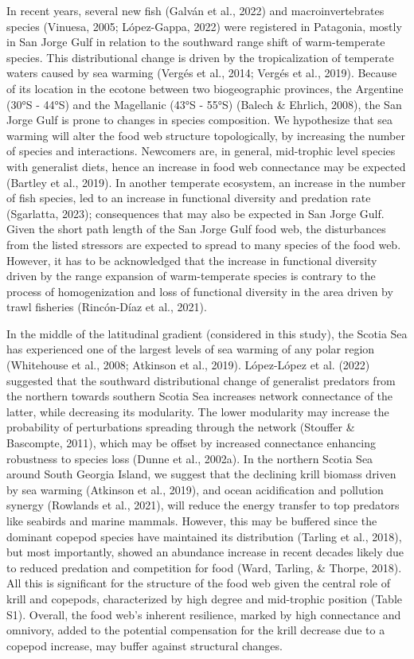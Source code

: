 \documentclass[
]{article}
\begin{document}
In recent years, several new fish (Galván et al., 2022) and
macroinvertebrates species (Vinuesa, 2005; López-Gappa, 2022) were
registered in Patagonia, mostly in San Jorge Gulf in relation to the
southward range shift of warm-temperate species. This distributional
change is driven by the tropicalization of temperate waters caused by
sea warming (Vergés et al., 2014; Vergés et al., 2019). Because of its
location in the ecotone between two biogeographic provinces, the
Argentine (30°S - 44°S) and the Magellanic (43°S - 55°S) (Balech \&
Ehrlich, 2008), the San Jorge Gulf is prone to changes in species
composition. We hypothesize that sea warming will alter the food web
structure topologically, by increasing the number of species and
interactions. Newcomers are, in general, mid-trophic level species with
generalist diets, hence an increase in food web connectance may be
expected (Bartley et al., 2019). In another temperate ecosystem, an
increase in the number of fish species, led to an increase in functional
diversity and predation rate (Sgarlatta, 2023); consequences that may
also be expected in San Jorge Gulf. Given the short path length of the
San Jorge Gulf food web, the disturbances from the listed stressors are
expected to spread to many species of the food web. However, it has to
be acknowledged that the increase in functional diversity driven by the
range expansion of warm-temperate species is contrary to the process of
homogenization and loss of functional diversity in the area driven by
trawl fisheries (Rincón-Díaz et al., 2021).

In the middle of the latitudinal gradient (considered in this study),
the Scotia Sea has experienced one of the largest levels of sea warming
of any polar region (Whitehouse et al., 2008; Atkinson et al., 2019).
López-López et al. (2022) suggested that the southward distributional
change of generalist predators from the northern towards southern Scotia
Sea increases network connectance of the latter, while decreasing its
modularity. The lower modularity may increase the probability of
perturbations spreading through the network (Stouffer \& Bascompte,
2011), which may be offset by increased connectance enhancing robustness
to species loss (Dunne et al., 2002a). In the northern Scotia Sea around
South Georgia Island, we suggest that the declining krill biomass driven
by sea warming (Atkinson et al., 2019), and ocean acidification and
pollution synergy (Rowlands et al., 2021), will reduce the energy
transfer to top predators like seabirds and marine mammals. However,
this may be buffered since the dominant copepod species have maintained
its distribution (Tarling et al., 2018), but most importantly, showed an
abundance increase in recent decades likely due to reduced predation and
competition for food (Ward, Tarling, \& Thorpe, 2018). All this is
significant for the structure of the food web given the central role of
krill and copepods, characterized by high degree and mid-trophic
position (Table S1). Overall, the food web's inherent resilience, marked
by high connectance and omnivory, added to the potential compensation
for the krill decrease due to a copepod increase, may buffer against
structural changes.
\end{document}
